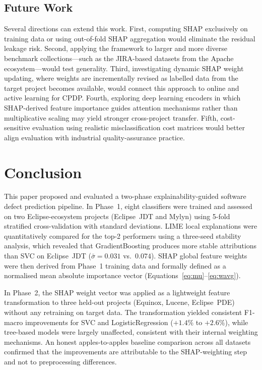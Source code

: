 \documentclass[12pt, a4paper]{article}
\newcommand{\model}[1]{\textsf{#1}}
\begin{document}
\subsection{Future Work}

Several directions can extend this work.
First, computing SHAP exclusively on training data or using out-of-fold SHAP
aggregation would eliminate the residual leakage risk.
Second, applying the framework to larger and more diverse benchmark
collections---such as the JIRA-based datasets from the Apache
ecosystem---would test generality.
Third, investigating dynamic SHAP weight updating, where weights are
incrementally revised as labelled data from the target project becomes
available, would connect this approach to online and active learning for CPDP.
Fourth, exploring deep learning encoders in which SHAP-derived feature
importance guides attention mechanisms rather than multiplicative scaling may
yield stronger cross-project transfer.
Fifth, cost-sensitive evaluation using realistic misclassification cost
matrices would better align evaluation with industrial quality-assurance
practice.

\section{Conclusion}
\label{sec:conclusion}

This paper proposed and evaluated a two-phase explainability-guided software
defect prediction pipeline. In Phase~1, eight classifiers were trained and
assessed on two Eclipse-ecosystem projects (Eclipse~JDT and Mylyn) using
5-fold stratified cross-validation with standard deviations.
LIME local explanations were quantitatively compared for the top-2 performers
using a three-seed stability analysis, which revealed that
\model{GradientBoosting} produces more stable attributions than \model{SVC}
on Eclipse~JDT ($\bar{\sigma}=0.031$ vs.\ $0.074$). SHAP global feature
weights were then derived from Phase~1 training data and formally defined as a
normalised mean absolute importance vector (Equations~\eqref{eq:mu}--\eqref{eq:wavg}).

In Phase~2, the SHAP weight vector was applied as a lightweight feature
transformation to three held-out projects (Equinox, Lucene, Eclipse~PDE)
without any retraining on target data. The transformation yielded consistent
F1-macro improvements for \model{SVC} and \model{LogisticRegression}
($+1.4\%$ to $+2.6\%$), while tree-based models were largely unaffected,
consistent with their internal weighting mechanisms. An honest
apples-to-apples baseline comparison across all datasets confirmed that the
improvements are attributable to the SHAP-weighting step and not to
preprocessing differences.
\end{document}

